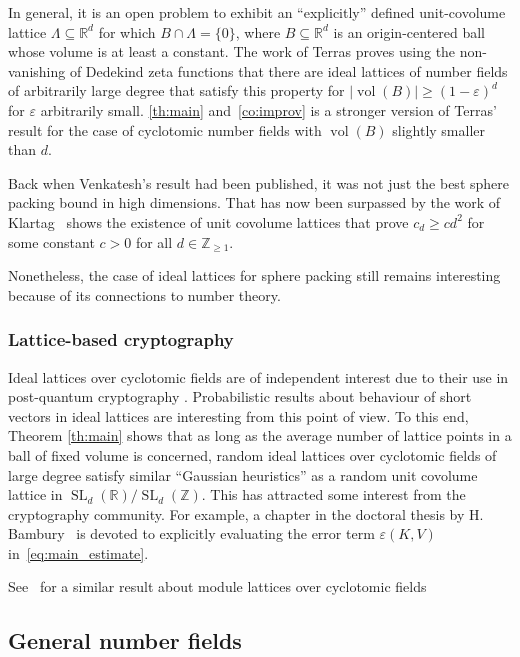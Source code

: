 \documentclass[a4paper]{article}
\theoremstyle{definition}
\theoremstyle{remark}
\DeclareMathOperator{\SL}{SL}
\DeclareMathOperator{\vol}{vol}
\begin{document}
In general, it is an open problem to exhibit an ``explicitly'' defined unit-covolume lattice $\Lambda \subseteq \mathbb{R}^{d}$
for which $B \cap \Lambda = \{0\}$, where $B \subseteq \mathbb{R}^{d}$ is an origin-centered ball whose volume is at least a constant.
The work of Terras \cite[Corollary 3]{T1980} proves using the non-vanishing of Dedekind zeta functions 
that there are ideal lattices of number fields of arbitrarily large degree 
that satisfy this property for $|\vol(B)| \geq (1- \varepsilon)^{d}$ for $\varepsilon$ arbitrarily small. 
\cref{th:main} and~\cref{co:improv} is a stronger version of Terras' result for the case of cyclotomic number fields with $\vol(B)$ slightly smaller than $d$.



Back when Venkatesh's result had been published, it was not just the best sphere packing bound in high dimensions.
That has now been surpassed by the work of Klartag~\cite{K25}
shows the existence of unit covolume lattices that prove $c_{d} \geq c d^{2}$ for some constant $c > 0$ for all $d \in \mathbb{Z}_{\geq 1}$.

Nonetheless, the case of ideal lattices for sphere packing still remains interesting because of its connections to number theory. 

\subsubsection*{Lattice-based cryptography}

 
Ideal lattices over cyclotomic fields are of independent interest 
due to their use in post-quantum cryptography \cite{BDPW20}. 
Probabilistic results about behaviour of short vectors in ideal lattices are interesting from this point of view. 
To this end, Theorem \ref{th:main} shows that as long as the average number of lattice points in a ball of fixed volume is concerned, random ideal lattices over cyclotomic fields of large degree 
satisfy similar ``Gaussian heuristics'' as a random unit covolume lattice in $\SL_{d}(\mathbb{R})/\SL_{d}(\mathbb{Z})$. 
This has attracted some interest from the cryptography community. 
For example, a chapter in the doctoral thesis by H. Bambury~\cite{B25} is devoted to explicitly evaluating the error term $\varepsilon(K,V)$ in~\cref{eq:main_estimate}. 

See~\cite{GSVV25} for a similar result about module lattices over cyclotomic fields

\subsection*{General number fields}
\end{document}

